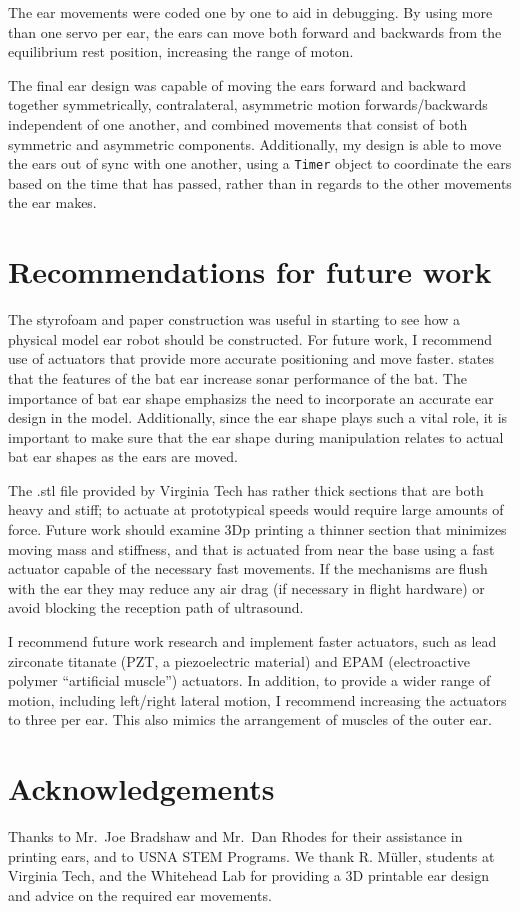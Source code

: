 \documentclass{article}
\begin{document}
The ear movements were coded one by one to aid in debugging. By using more than one servo per ear, the ears can move both forward and backwards from the equilibrium rest position, increasing the range of moton.  

The final ear design was capable of moving the ears forward and backward together symmetrically, contralateral, asymmetric motion forwards/backwards independent of one another, and combined movements that consist of both symmetric and asymmetric components. Additionally, my design is able to move the ears out of sync with one another, using a \lstinline{Timer} object to coordinate the ears based on the time that has passed, rather than in regards to the other movements the ear makes.  






\section{Recommendations for future work}
The styrofoam and paper construction was useful in starting to see how a physical model ear robot should be constructed. For future work, I recommend use of actuators that provide more accurate positioning and move faster. \citep{pannala2013interplay} states that the features of the bat ear increase sonar performance of the bat. The importance of bat ear shape emphasizs the need to incorporate an accurate ear design in the model. Additionally, since the ear shape plays such a vital role, it is important to make sure that the ear shape during manipulation relates to actual bat ear shapes as the ears are moved. 

The .stl file provided by Virginia Tech has rather thick sections that are both heavy and stiff; to actuate at prototypical speeds would require large amounts of force.  Future work should examine 3Dp printing a thinner section that minimizes moving mass and stiffness, and that is actuated from near the base using a fast actuator capable of the necessary fast movements. If the mechanisms are flush with the ear they may reduce any air drag (if necessary in flight hardware) or avoid blocking the reception path of ultrasound. 

I recommend future work research and implement faster actuators, such as lead zirconate titanate (PZT, a piezoelectric material) and EPAM (electroactive polymer ``artificial muscle'') actuators. In addition, to provide a wider range of motion, including left/right lateral motion, I recommend increasing the actuators to three per ear. This also mimics the arrangement of muscles of the outer ear. 

\section*{Acknowledgements}
Thanks to Mr.~Joe Bradshaw and Mr.~Dan Rhodes for their assistance in printing ears, and to USNA STEM Programs. We thank R. M{\"u}ller, students at Virginia Tech, and the Whitehead Lab for providing a 3D printable ear design and advice on the required ear movements. 


\end{document}
